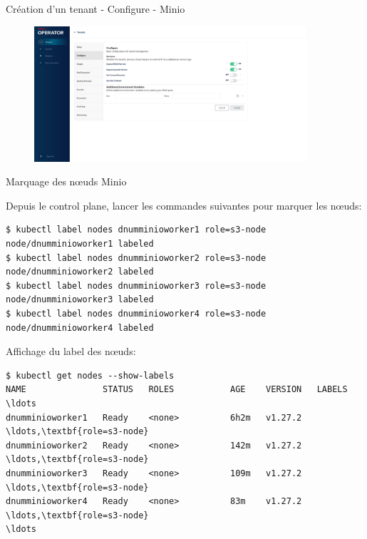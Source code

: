 
\begin{frame}[fragile]{Création d'un tenant - Configure - Minio}

\begin{figure}
\begin{center}
\includegraphics[angle=0, width=0.9\textwidth, height=0.8\textheight]{images/configure_minio.eps}
\end{center}
\end{figure}

\end{frame}


\begin{frame}[fragile]{Marquage des n\oe{}uds Minio}

   Depuis le control plane, lancer les commandes suivantes pour marquer les n\oe{}uds:
\begin{tiny}
\begin{Verbatim}[commandchars=\\\{\}]
$ kubectl label nodes dnumminioworker1 role=s3-node
node/dnumminioworker1 labeled
$ kubectl label nodes dnumminioworker2 role=s3-node
node/dnumminioworker2 labeled
$ kubectl label nodes dnumminioworker3 role=s3-node
node/dnumminioworker3 labeled
$ kubectl label nodes dnumminioworker4 role=s3-node
node/dnumminioworker4 labeled
\end{Verbatim}
\end{tiny}

   Affichage du label des n\oe{}uds:
\begin{tiny}
\begin{Verbatim}[commandchars=\\\{\}]
$ kubectl get nodes --show-labels
NAME               STATUS   ROLES           AGE    VERSION   LABELS
\ldots
dnumminioworker1   Ready    <none>          6h2m   v1.27.2   \ldots,\textbf{role=s3-node}
dnumminioworker2   Ready    <none>          142m   v1.27.2   \ldots,\textbf{role=s3-node}
dnumminioworker3   Ready    <none>          109m   v1.27.2   \ldots,\textbf{role=s3-node}
dnumminioworker4   Ready    <none>          83m    v1.27.2   \ldots,\textbf{role=s3-node}
\ldots

\end{Verbatim}
\end{tiny}

\end{frame}

